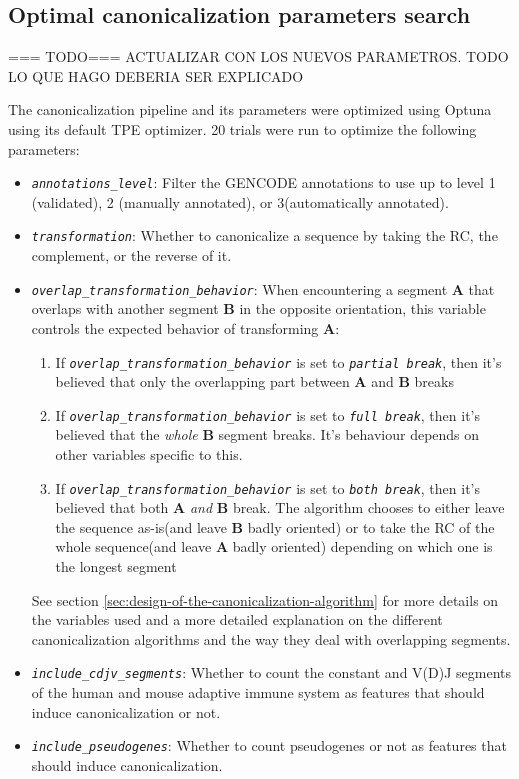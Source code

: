 \documentclass[   ]{article}
\let\oldtexttt\texttt
\renewcommand{\texttt}[1]{\oldtexttt{\itshape #1}}
\begin{document}
\subsection{Optimal canonicalization parameters search}
\label{sec:methods_optimal_canonicalization_search}

=== TODO=== ACTUALIZAR CON LOS NUEVOS PARAMETROS. TODO LO QUE HAGO DEBERIA SER EXPLICADO

The canonicalization pipeline and its parameters were optimized using Optuna \citep{akibaOptunaNextgenerationHyperparameter2019} using its default TPE optimizer. 20 trials were run to optimize the following parameters:

\begin{itemize}
	\item \texttt{annotations\_level}: Filter the GENCODE annotations to use up to level 1 (validated), 2 (manually annotated), or 3(automatically annotated).
	\item \texttt{transformation}: Whether to canonicalize a sequence by taking the RC, the complement, or the reverse of it.
	\item \texttt{overlap\_transformation\_behavior}: When encountering a segment \textbf{A} that overlaps with another segment \textbf{B} in the opposite orientation, this variable controls the expected behavior of transforming \textbf{A}:
	\begin{enumerate}
		\item If \texttt{overlap\_transformation\_behavior} is set to \texttt{partial break}, then it's believed that only the overlapping part between \textbf{A} and \textbf{B} breaks
		\item If \texttt{overlap\_transformation\_behavior} is set to \texttt{full break}, then it's believed that the \emph{whole} \textbf{B} segment breaks. It's behaviour depends on other variables specific to this.
		\item If \texttt{overlap\_transformation\_behavior} is set to \texttt{both break}, then it's believed that both \textbf{A} \emph{and} \textbf{B} break. The algorithm chooses to either leave the sequence as-is(and leave \textbf{B} badly oriented) or to take the RC of the whole sequence(and leave \textbf{A} badly oriented) depending on which one is the longest segment
	\end{enumerate}
	
	See section \ref{sec:design-of-the-canonicalization-algorithm} for more details on the variables used and a more detailed explanation on the different canonicalization algorithms and the way they deal with overlapping segments.
	
	\item \texttt{include\_cdjv\_segments}: Whether to count the
	constant and V(D)J segments of the human and mouse adaptive immune system as features that should induce canonicalization or not.
	\item \texttt{include\_pseudogenes}: Whether to count pseudogenes or not as features that should induce canonicalization.
\end{itemize}
\end{document}
